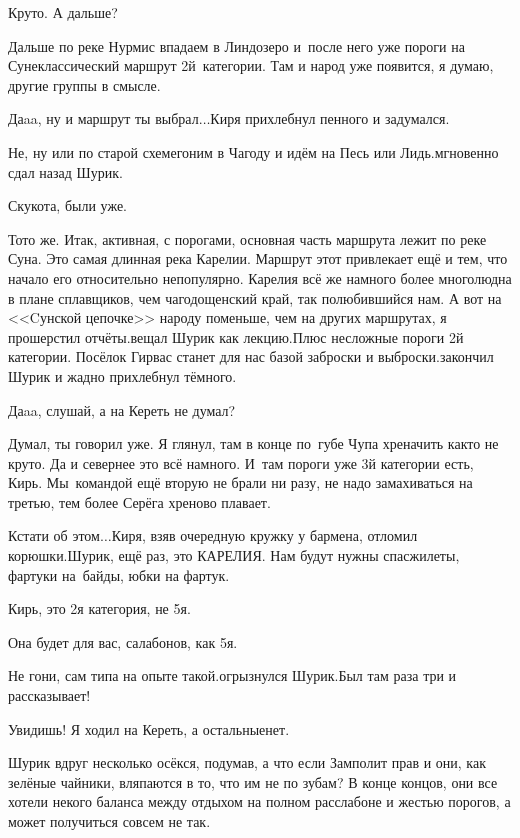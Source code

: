 \diagdash Круто. А дальше? 

\diagdash Дальше по реке Нурмис впадаем в Линдозеро и~после него уже пороги на Суне\mdash классический маршрут 2\sdash й~категории. Там и народ уже появится, я думаю, другие группы в смысле.

\diagdash Да\sdash a\sdash a, ну и маршрут ты выбрал$\ldots$\mdash Киря прихлебнул пенного и задумался.

\diagdash Не, ну или по старой схеме\mdash гоним в Чагоду и идём на Песь или Лидь.\mdash мгновенно сдал назад Шурик.

\diagdash Скукота, были уже.

\diagdash То\sdash то же. Итак, активная, с порогами, основная часть маршрута лежит по реке Суна. Это самая длинная река Карелии. Маршрут этот привлекает ещё и тем, что начало его относительно непопулярно. Карелия всё же намного более многолюдна в плане сплавщиков, чем чагодощенский край, так полюбившийся нам. А вот на <<Cунской цепочке>> народу поменьше, чем на других маршрутах, я прошерстил отчёты.\mdash вещал Шурик как лекцию.\mdash Плюс несложные пороги 2\sdash й категории. Посёлок Гирвас станет для нас базой заброски и выброски.\mdash закончил Шурик и жадно прихлебнул тёмного.

\diagdash Да\sdash a\sdash a, слушай, а на Кереть не думал?

\diagdash Думал, ты говорил уже. Я глянул, там в конце по~губе Чупа хреначить как\sdash то не круто. Да и севернее это всё намного. И~там пороги уже 3\sdash й категории есть, Кирь. Мы~командой ещё вторую не брали ни разу, не надо замахиваться на третью, тем более Серёга хреново плавает. 

\diagdash Кстати об этом$\ldots$\mdash Киря, взяв очередную кружку у бармена, отломил корюшки.\mdash Шурик, ещё раз, это КАРЕЛИЯ. Нам будут нужны спасжилеты, фартуки на~байды, юбки на фартук.

\diagdash Кирь, это 2\sdash я категория, не 5\sdash я.

\diagdash Она будет для вас, салабонов, как 5\sdash я.

\diagdash Не гони, сам типа на опыте такой.\mdash огрызнулся Шурик.\mdash Был там раза три и рассказывает!

\diagdash Увидишь! Я ходил на Кереть, а остальные\mdash нет.

Шурик вдруг несколько осёкся, подумав, а что если Замполит прав и они, как зелёные чайники, вляпаются в то, что им не по зубам? В конце концов, они все хотели некого баланса между отдыхом на полном расслабоне и жестью порогов, а может получиться совсем не так.

